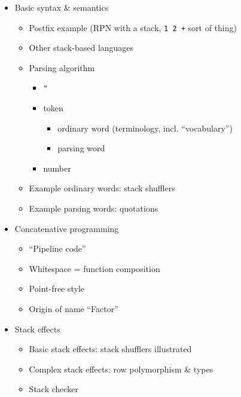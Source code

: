 \documentclass[11pt]{article}
\begin{document}
\begin{itemize}

\item Basic syntax \& semantics
      \begin{itemize}
        \item Postfix example (RPN with a stack, \verb|1 2 +| sort of thing)
        \item Other stack-based languages
        \item Parsing algorithm
              \begin{itemize}
                \item \verb|"|
                \item token
                      \begin{itemize}
                        \item ordinary word (terminology, incl. ``vocabulary'')
                        \item parsing word
                      \end{itemize}
                \item number
              \end{itemize}
        \item Example ordinary words: stack shufflers
        \item Example parsing words: quotations
      \end{itemize}

\item Concatenative programming
      \begin{itemize}
        \item ``Pipeline code''
        \item Whitespace = function composition
        \item Point-free style
        \item Origin of name ``Factor''
      \end{itemize}

\item Stack effects
      \begin{itemize}
        \item Basic stack effects: stack shufflers illustrated
        \item Complex stack effects: row polymorphism \& types
        \item Stack checker
      \end{itemize}


\end{itemize}
\end{document}
